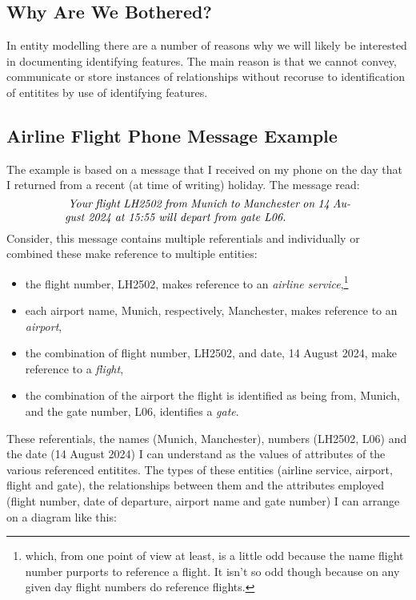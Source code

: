 \subsection{Why Are We Bothered?}
\mynote
In entity modelling there are a number of reasons why we will likely be
interested in documenting identifying features. The main reason is that we cannot convey, communicate or store instances of relationships without recoruse to identification of entitites by use of identifying features. 

\subsection{Airline Flight Phone Message Example}
\mynote 
The example is based on a message that I received on my phone on the day that I returned from a recent (at time of writing) holiday. The message read:
\begin{equation}
\label{LH2502PhoneMessage}
\text{\parbox{9cm}{\textit{
Your flight LH2502 from Munich to Manchester on 14 August 2024 at 15:55 will depart from gate L06.}}}
\end{equation}
Consider, this message contains multiple referentials and individually or combined these make reference to
multiple entities:
\begin{itemize}
	\item the flight number, LH2502, makes reference to an \textit{airline service},\footnote{which, from one point of view at least, is a little odd because the name flight number purports to reference a flight. It isn't so odd though because on any given day flight numbers do reference flights.}
	\item each airport name, Munich, respectively, Manchester, makes reference to an \textit{airport},
	\item the combination of flight number, LH2502, and date, 14 August 2024, make reference to a \textit{flight},
	\item the combination of the airport the flight is identified as being from, Munich, and the gate number, 
	L06, identifies a \textit{gate}.
\end{itemize}
\mynote 
These referentials, the names (Munich, Manchester), numbers (LH2502, L06) and the date (14 August 2024)
I can understand as the values of attributes of the various referenced entitites. 
The types of these entities (airline service, airport, flight and gate), the relationships between them and the attributes employed
(flight number, date of departure, airport name and gate number) I can arrange on a diagram like this:
